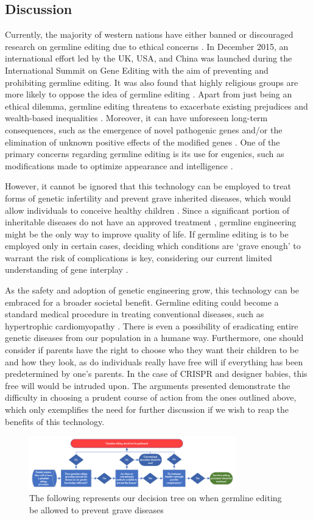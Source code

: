 \documentclass[12pt]{article}
\begin{document}
\subsection*{Discussion}

Currently, the majority of western nations have either banned or discouraged
research on germline editing due to ethical concerns
\parencite{araki_ishii_2014}. In December 2015, an international effort led by
the UK, USA, and China was launched during the International Summit on Gene
Editing with the aim of preventing and prohibiting germline editing. It was
also found that highly religious groups are more likely to oppose the idea of
germline editing \parencite{funk_kennedy_sciupac_2020}. Apart from just being
an ethical dilemma, germline editing threatens to exacerbate existing
prejudices and wealth-based inequalities \parencite{cbs_news_2021}. Moreover,
it can have unforeseen long-term consequences, such as the emergence of novel
pathogenic genes and/or the elimination of unknown positive effects of the
modified genes \parencite{rubeis_steger_2018}. One of the primary concerns
regarding germline editing is its use for eugenics, such as modifications made
to optimize appearance and intelligence
\parencite{world_health_organization_2021}.

However, it cannot be ignored that this technology can be employed to treat
forms of genetic infertility and prevent grave inherited diseases, which would
allow individuals to conceive healthy children \parencite{rubeis_steger_2018}.
Since a significant portion of inheritable diseases do not have an approved
treatment \parencite{department_uk_2021}, germline engineering might be the
only way to improve quality of life. If germline editing is to be employed only
in certain cases, deciding which conditions are `grave enough' to warrant the
risk of complications is key, considering our current limited understanding of
gene interplay \parencite{rubeis_steger_2018}.

As the safety and adoption of genetic engineering grow, this technology can be
embraced for a broader societal benefit. Germline editing could become a
standard medical procedure in treating conventional diseases, such as
hypertrophic cardiomyopathy \parencite{ledford_2017}. There is even a
possibility of eradicating entire genetic diseases from our population in a
humane way. Furthermore, one should consider if parents have the right to
choose who they want their children to be and how they look, as do individuals
really have free will if everything has been predetermined by one's parents. In
the case of CRISPR and designer babies, this free will would be intruded upon.
The arguments presented demonstrate the difficulty in choosing a prudent course
of action from the ones outlined above, which only exemplifies the need for
further discussion if we wish to reap the benefits of this technology.

\begin{figure}[H]
    \centering
    \includegraphics[width=0.8\textwidth]{flowchart.png}
    \caption{The following represents our decision tree on when germline editing be allowed to prevent grave diseases}\label{fig:my_label}
\end{figure}

\printbibliography[]
\end{document}
